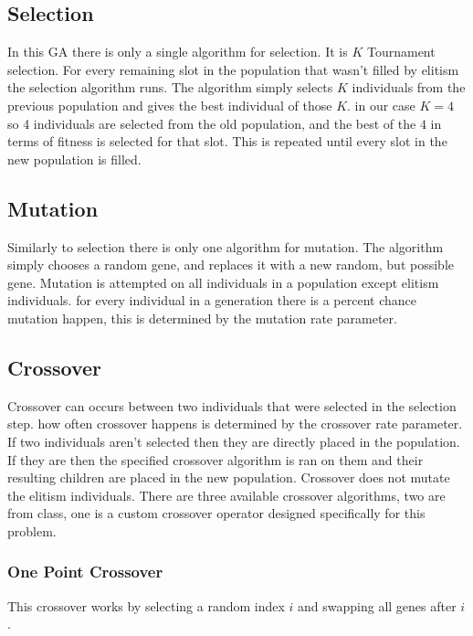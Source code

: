 \documentclass[conference]{IEEEtran}
\begin{document}
\subsection{Selection}
In this GA there is only a single algorithm for selection. It is $K$ Tournament selection. For every remaining slot in the population that wasn't filled by elitism the selection algorithm runs. The algorithm simply selects $K$ individuals from the previous population and gives the best individual of those $K$. in our case $K=4$ so 4 individuals are selected from the old population, and the best of the $4$ in terms of fitness is selected for that slot. This is repeated until every slot in the new population is filled.   


\subsection{Mutation}
Similarly to selection there is only one algorithm for mutation. The algorithm simply chooses a random gene, and replaces it with a new random, but possible gene. Mutation is attempted on all individuals in a population except elitism individuals. for every individual in a generation there is a percent chance mutation happen, this is determined by the mutation rate parameter. 

\subsection{Crossover}
Crossover can occurs between two individuals that were selected in the selection step. how often crossover happens is determined by the crossover rate parameter. If two individuals aren't selected then they are directly placed in the population. If they are then the specified crossover algorithm is ran on them and their resulting children are placed in the new population. Crossover does not mutate the elitism individuals. There are three available crossover algorithms, two are from class, one is a custom crossover operator designed specifically for this problem.

\subsubsection{One Point Crossover} This crossover works by selecting a random index $i$ and swapping all genes after $i$ \cite[p. 17]{ga-tut1}. 
\begin{center}

\end{center}
\end{document}
